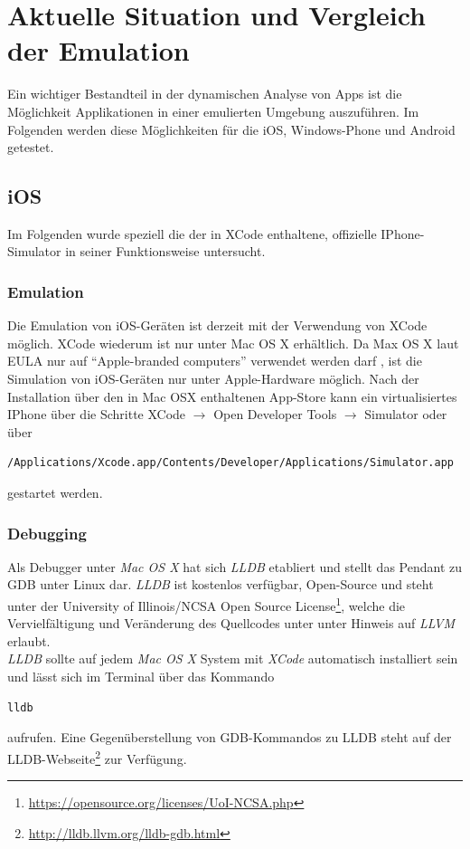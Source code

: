\section{Aktuelle Situation und Vergleich der Emulation}
Ein wichtiger Bestandteil in der dynamischen Analyse von Apps ist die Möglichkeit Applikationen  in einer emulierten Umgebung auszuführen. Im Folgenden werden diese Möglichkeiten für die iOS, Windows-Phone und Android getestet.
 
	\subsection{iOS}
	Im Folgenden wurde speziell die der in XCode enthaltene, offizielle IPhone-Simulator in seiner Funktionsweise untersucht.
	
			\subsubsection{Emulation}\label{ref:emulation}
			Die Emulation von iOS-Geräten ist derzeit mit der Verwendung von XCode möglich. XCode wiederum ist nur unter Mac OS X erhältlich. Da Max OS X laut EULA nur auf "`Apple-branded computers"' verwendet werden darf \cite{AppleEULA}, ist die Simulation von iOS-Geräten nur unter Apple-Hardware möglich. Nach der Installation über den in Mac OSX enthaltenen App-Store kann ein virtualisiertes IPhone über die Schritte XCode $\rightarrow$ Open Developer Tools $\rightarrow$ Simulator oder über 
\begin{lstlisting}
/Applications/Xcode.app/Contents/Developer/Applications/Simulator.app
\end{lstlisting}			
gestartet werden.\\
			
		\subsubsection{Debugging}
Als Debugger unter \textit{Mac OS X} hat sich \textit{LLDB} etabliert und stellt das Pendant zu GDB unter Linux dar. \textit{LLDB} ist kostenlos verfügbar, Open-Source und steht unter der University of Illinois/NCSA Open Source License\footnote{\url{https://opensource.org/licenses/UoI-NCSA.php}}, welche die Vervielfältigung und Veränderung des Quellcodes unter unter Hinweis auf \textit{LLVM} erlaubt.\\

\textit{LLDB} sollte auf jedem \textit{Mac OS X} System mit \textit{XCode} automatisch installiert sein und lässt sich im Terminal über das Kommando
\begin{lstlisting}
lldb
\end{lstlisting} aufrufen. Eine Gegenüberstellung von GDB-Kommandos zu LLDB steht auf der LLDB-Webseite\footnote{\url{http://lldb.llvm.org/lldb-gdb.html}} zur Verfügung.\\

